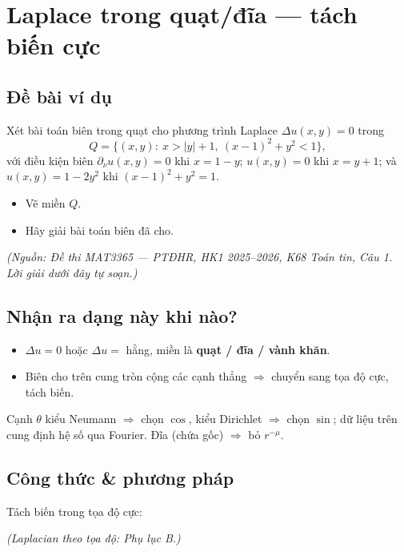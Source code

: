 
\section{Laplace trong quạt/đĩa --- tách biến cực}

\subsection*{Đề bài ví dụ}
Xét bài toán biên trong quạt cho phương trình Laplace $\Delta u(x,y)=0$ trong
\[
  Q=\{(x,y):\ x>|y|+1,\ (x-1)^2+y^2<1\},
\]
với điều kiện biên $\partial_\nu u(x,y)=0$ khi $x=1-y$; $u(x,y)=0$ khi $x=y+1$; và $u(x,y)=1-2y^2$ khi $(x-1)^2+y^2=1$.
\begin{itemize}
  \item[(a)] Vẽ miền $Q$.
  \item[(b)] Hãy giải bài toán biên đã cho.
\end{itemize}

\emph{\small(Nguồn: Đề thi MAT3365 --- PTĐHR, HK1 2025--2026, K68 Toán tin, Câu 1. Lời giải dưới đây tự soạn.)}

\subsection*{Nhận ra dạng này khi nào?}
\begin{itemize}
  \item $\Delta u=0$ hoặc $\Delta u=$ hằng, miền là \textbf{quạt / đĩa / vành khăn}.
  \item Biên cho trên cung tròn cộng các cạnh thẳng $\Rightarrow$ chuyển sang tọa độ cực, tách biến.
\end{itemize}
\begin{meobox}
Cạnh $\theta$ kiểu Neumann $\Rightarrow$ chọn $\cos$, kiểu Dirichlet $\Rightarrow$ chọn $\sin$;
dữ liệu trên cung định hệ số qua Fourier. Đĩa (chứa gốc) $\Rightarrow$ bỏ $r^{-\mu}$.
\end{meobox}

\subsection*{Công thức \& phương pháp}
Tách biến trong tọa độ cực:

\emph{(Laplacian theo tọa độ: Phụ lục B.)}

